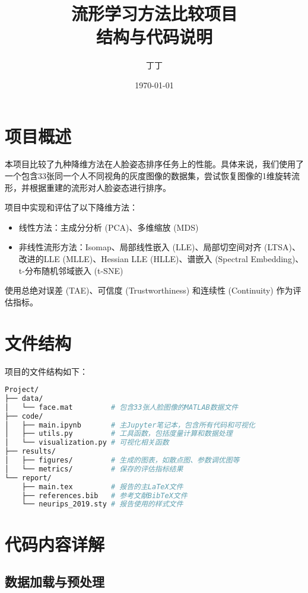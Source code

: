\documentclass{article}
\title{流形学习方法比较项目\\结构与代码说明}
\author{丁丁}
\date{\today}
\begin{document}
\maketitle

\section{项目概述}

本项目比较了九种降维方法在人脸姿态排序任务上的性能。具体来说，我们使用了一个包含33张同一个人不同视角的灰度图像的数据集，尝试恢复图像的1维旋转流形，并根据重建的流形对人脸姿态进行排序。

项目中实现和评估了以下降维方法：
\begin{itemize}
    \item 线性方法：主成分分析 (PCA)、多维缩放 (MDS)
    \item 非线性流形方法：Isomap、局部线性嵌入 (LLE)、局部切空间对齐 (LTSA)、改进的LLE (MLLE)、Hessian LLE (HLLE)、谱嵌入 (Spectral Embedding)、t-分布随机邻域嵌入 (t-SNE)
\end{itemize}

使用总绝对误差 (TAE)、可信度 (Trustworthiness) 和连续性 (Continuity) 作为评估指标。

\section{文件结构}

项目的文件结构如下：

\begin{lstlisting}[language=bash]
Project/
├── data/
│   └── face.mat         # 包含33张人脸图像的MATLAB数据文件
├── code/
│   ├── main.ipynb       # 主Jupyter笔记本，包含所有代码和可视化
│   ├── utils.py         # 工具函数，包括度量计算和数据处理
│   └── visualization.py # 可视化相关函数
├── results/
│   ├── figures/         # 生成的图表，如散点图、参数调优图等
│   └── metrics/         # 保存的评估指标结果
└── report/
    ├── main.tex         # 报告的主LaTeX文件
    ├── references.bib   # 参考文献BibTeX文件
    └── neurips_2019.sty # 报告使用的样式文件
\end{lstlisting}

\section{代码内容详解}

\subsection{数据加载与预处理}
\end{document}
